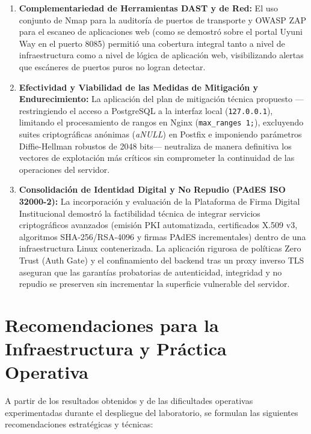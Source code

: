 \begin{enumerate}
  \item \textbf{Complementariedad de Herramientas DAST y de Red:} El uso conjunto de Nmap para la auditoría de puertos de transporte y OWASP ZAP para el escaneo de aplicaciones web (como se demostró sobre el portal Uyuni Way en el puerto 8085) permitió una cobertura integral tanto a nivel de infraestructura como a nivel de lógica de aplicación web, visibilizando alertas que escáneres de puertos puros no logran detectar.

  \item \textbf{Efectividad y Viabilidad de las Medidas de Mitigación y Endurecimiento:} La aplicación del plan de mitigación técnica propuesto —restringiendo el acceso a PostgreSQL a la interfaz local (\texttt{127.0.0.1}), limitando el procesamiento de rangos en Nginx (\texttt{max\_ranges 1;}), excluyendo suites criptográficas anónimas (\textit{aNULL}) en Postfix e imponiendo parámetros Diffie-Hellman robustos de 2048 bits— neutraliza de manera definitiva los vectores de explotación más críticos sin comprometer la continuidad de las operaciones del servidor.

  \item \textbf{Consolidación de Identidad Digital y No Repudio (PAdES ISO 32000-2):} La incorporación y evaluación de la Plataforma de Firma Digital Institucional demostró la factibilidad técnica de integrar servicios criptográficos avanzados (emisión PKI automatizada, certificados X.509 v3, algoritmos SHA-256/RSA-4096 y firmas PAdES incrementales) dentro de una infraestructura Linux contenerizada. La aplicación rigurosa de políticas Zero Trust (Auth Gate) y el confinamiento del backend tras un proxy inverso TLS aseguran que las garantías probatorias de autenticidad, integridad y no repudio se preserven sin incrementar la superficie vulnerable del servidor.
\end{enumerate}

\section{Recomendaciones para la Infraestructura y Práctica Operativa}

A partir de los resultados obtenidos y de las dificultades operativas experimentadas durante el despliegue del laboratorio, se formulan las siguientes recomendaciones estratégicas y técnicas:

